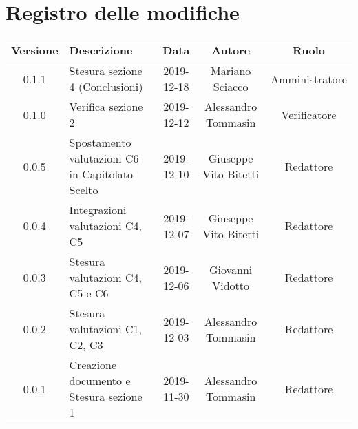 \section*{Registro delle modifiche}

\begin{center}
	\begin{longtable}{|c|p{4cm}|c|c|c|}
	\hline
	\rowcolor{lighter-grayer}
	\textbf{Versione} & \textbf{Descrizione} & \textbf{Data} & \textbf{Autore} & \textbf{Ruolo} \\
	\hline
	\endfirsthead

	
	\hline
	0.1.1 & Stesura sezione 4 (Conclusioni) & 2019-12-18 & Mariano Sciacco & Amministratore \\
	\hline
	0.1.0 & Verifica sezione 2 & 2019-12-12 & Alessandro Tommasin & Verificatore \\
	\hline
	0.0.5 & Spostamento valutazioni C6 in Capitolato Scelto & 2019-12-10 & Giuseppe Vito Bitetti & Redattore \\
	\hline
	0.0.4 & Integrazioni valutazioni C4, C5 & 2019-12-07 & Giuseppe Vito Bitetti & Redattore \\
	\hline
	0.0.3 & Stesura valutazioni C4, C5 e C6 & 2019-12-06 & Giovanni Vidotto & Redattore \\
	\hline
	0.0.2 & Stesura valutazioni C1, C2, C3 & 2019-12-03 & Alessandro Tommasin & Redattore \\
	\hline
	0.0.1 & Creazione documento e Stesura sezione 1 & 2019-11-30 & Alessandro Tommasin & Redattore \\
	\hline
	
	\end{longtable}
\end{center}
